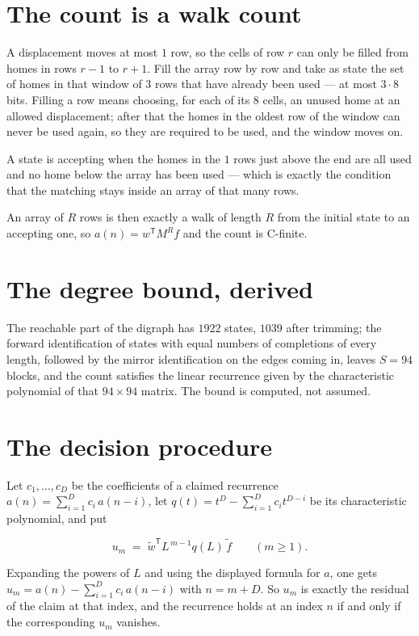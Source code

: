 \documentclass[11pt]{article}
\theoremstyle{definition}
\begin{document}
\section{The count is a walk count}

A displacement moves at most $1$ row, so the cells of row $r$ can only be filled from homes in rows $r-1$ to $r+1$. Fill the array row by row and take as state the set of homes in that window of $3$ rows that have already been used --- at most $3\cdot8$ bits. Filling a row means choosing, for each of its $8$ cells, an unused home at an allowed displacement; after that the homes in the oldest row of the window can never be used again, so they are required to be used, and the window moves on.

A state is accepting when the homes in the $1$ rows just above the end are all used and no home below the array has been used --- which is exactly the condition that the matching stays inside an array of that many rows.

An array of $R$ rows is then exactly a walk of length $R$ from the initial state to an accepting one, so $a(n) = w^{\mathsf T}M^{R}f$ and the count is C-finite.

\section{The degree bound, derived}

The reachable part of the digraph has $1922$ states, $1039$ after trimming; the forward identification of states with equal numbers of completions of every length, followed by the mirror identification on the edges coming in, leaves $S = 94$ blocks, and the count satisfies the linear recurrence given by the characteristic polynomial of that $94\times94$ matrix. The bound is computed, not assumed.

\section{The decision procedure}

Let $c_1,\dots,c_D$ be the coefficients of a claimed recurrence $a(n) = \sum_{i=1}^{D} c_i\,a(n-i)$, let $q(t) = t^{D} - \sum_{i=1}^{D} c_i t^{D-i}$ be its characteristic polynomial, and put

\[u_m \;=\; \tilde w^{\mathsf T} L^{\,m-1} q(L)\,\tilde f \qquad (m \ge 1).\]

Expanding the powers of $L$ and using the displayed formula for $a$, one gets $u_m = a(n) - \sum_{i=1}^{D} c_i\,a(n-i)$ with $n = m + D$. So $u_m$ is exactly the residual of the claim at that index, and the recurrence holds at an index $n$ if and only if the corresponding $u_m$ vanishes.
\end{document}
